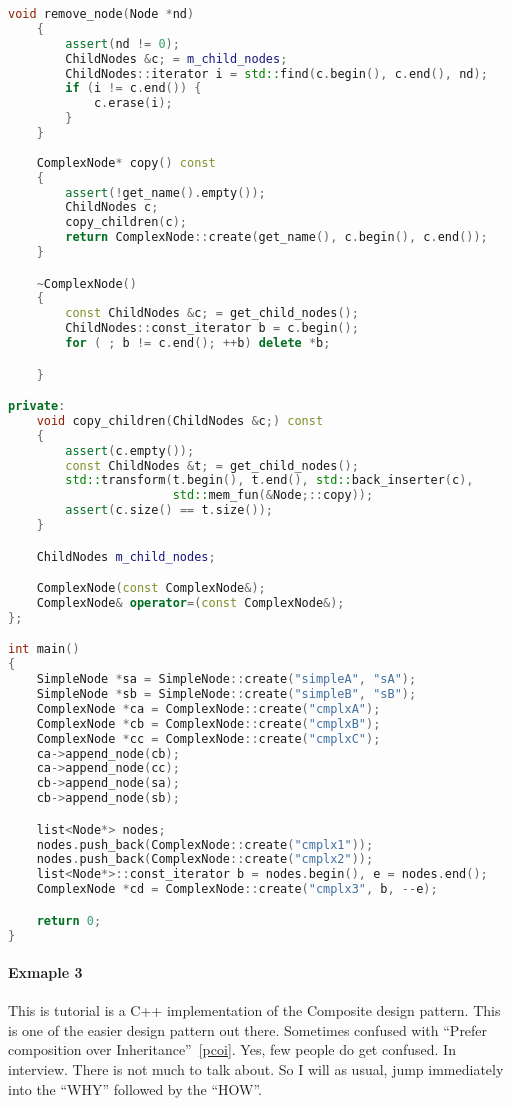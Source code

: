 \documentclass{book}
\begin{document}
\begin{lstlisting}[caption={Composite Pattern - sample 2}, language=c++]
    void remove_node(Node *nd)
    {
        assert(nd != 0);
        ChildNodes &c; = m_child_nodes;
        ChildNodes::iterator i = std::find(c.begin(), c.end(), nd);
        if (i != c.end()) {
            c.erase(i);
        }
    }
	
    ComplexNode* copy() const
    {
        assert(!get_name().empty());
        ChildNodes c;
        copy_children(c);
        return ComplexNode::create(get_name(), c.begin(), c.end());
    }

    ~ComplexNode()
    {
        const ChildNodes &c; = get_child_nodes();
        ChildNodes::const_iterator b = c.begin();
        for ( ; b != c.end(); ++b) delete *b;

    }

private:
    void copy_children(ChildNodes &c;) const
    {
        assert(c.empty());
        const ChildNodes &t; = get_child_nodes();
        std::transform(t.begin(), t.end(), std::back_inserter(c),
                       std::mem_fun(&Node;::copy));
        assert(c.size() == t.size());
    }

    ChildNodes m_child_nodes;

    ComplexNode(const ComplexNode&);
    ComplexNode& operator=(const ComplexNode&);
};

int main()
{
	SimpleNode *sa = SimpleNode::create("simpleA", "sA");
	SimpleNode *sb = SimpleNode::create("simpleB", "sB");
	ComplexNode *ca = ComplexNode::create("cmplxA");
	ComplexNode *cb = ComplexNode::create("cmplxB");
	ComplexNode *cc = ComplexNode::create("cmplxC");
	ca->append_node(cb);
	ca->append_node(cc);
	cb->append_node(sa);
	cb->append_node(sb);

	list<Node*> nodes;
	nodes.push_back(ComplexNode::create("cmplx1"));
	nodes.push_back(ComplexNode::create("cmplx2"));
	list<Node*>::const_iterator b = nodes.begin(), e = nodes.end();
	ComplexNode *cd = ComplexNode::create("cmplx3", b, --e);

	return 0;
}
\end{lstlisting}

\paragraph{Exmaple 3}
This is tutorial is a C++ implementation of the Composite design pattern. This is one of the easier design pattern out there.
Sometimes confused with ``Prefer composition over Inheritance''~\ref{pcoi}. Yes, few people do get confused. In interview.
There is not much to talk about. So I will as usual, jump immediately into the “WHY” followed by the “HOW”.
\end{document}
